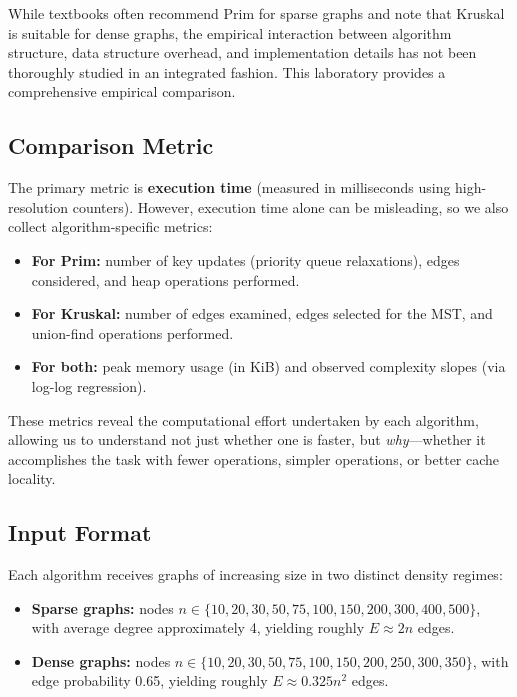 \documentclass{labreport}
\begin{document}
While textbooks often recommend Prim for sparse graphs and note that Kruskal is suitable for dense graphs, the empirical interaction between algorithm structure, data structure overhead, and implementation details has not been thoroughly studied in an integrated fashion. This laboratory provides a comprehensive empirical comparison.

\subsection{Comparison Metric}

The primary metric is \textbf{execution time} (measured in milliseconds using high-resolution counters). However, execution time alone can be misleading, so we also collect algorithm-specific metrics:

\begin{itemize}
    \item \textbf{For Prim:} number of key updates (priority queue relaxations), edges considered, and heap operations performed.
    \item \textbf{For Kruskal:} number of edges examined, edges selected for the MST, and union-find operations performed.
    \item \textbf{For both:} peak memory usage (in KiB) and observed complexity slopes (via log-log regression).
\end{itemize}

These metrics reveal the computational effort undertaken by each algorithm, allowing us to understand not just whether one is faster, but \textit{why}---whether it accomplishes the task with fewer operations, simpler operations, or better cache locality.

\subsection{Input Format}

Each algorithm receives graphs of increasing size in two distinct density regimes:

\begin{itemize}
    \item \textbf{Sparse graphs:} nodes $n \in \{10, 20, 30, 50, 75, 100, 150, 200, 300, 400, 500\}$, with average degree approximately 4, yielding roughly $E \approx 2n$ edges.
    
    \item \textbf{Dense graphs:} nodes $n \in \{10, 20, 30, 50, 75, 100, 150, 200, 250, 300, 350\}$, with edge probability 0.65, yielding roughly $E \approx 0.325n^2$ edges.
\end{itemize}
\end{document}

